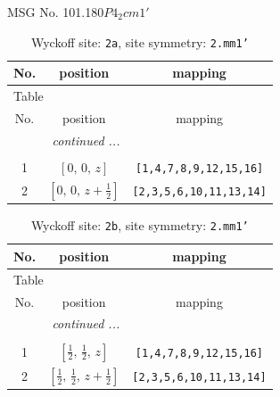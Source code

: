 \documentclass[fleqn,8pt]{jsarticle}
\begin{document}
\setcounter{MaxMatrixCols}{32}

\renewcommand{\tablename}{Table~}
\renewcommand{\figurename}{Figure~}
\begin{center}
\LARGE
MSG No. 101.180\quad$P4_{2}cm1'$
\end{center}
\renewcommand{\arraystretch}{1.2}
\begin{longtable}{ccc}
\caption{Wyckoff site: {\tt 2a}, site symmetry: {\tt 2.mm1'}}
 \\
 \hline \hline
No. & position & mapping \\ \hline \endfirsthead

\multicolumn{2}{l}{\tablename\ \thetable{}} \\
 \hline \hline
No. & position & mapping \\ \hline \endhead

 \hline \hline
\multicolumn{2}{r}{\footnotesize\it continued ...} \\ \endfoot

 \hline \hline
\multicolumn{2}{r}{} \\ \endlastfoot

1 & $\left[ 0,\, 0,\, z \right]$ & {\tt [1,4,7,8,9,12,15,16]} \\ \hline
2 & $\left[ 0,\, 0,\, z + \frac{1}{2} \right]$ & {\tt [2,3,5,6,10,11,13,14]} \\
\end{longtable}
\renewcommand{\arraystretch}{1.2}
\begin{longtable}{ccc}
\caption{Wyckoff site: {\tt 2b}, site symmetry: {\tt 2.mm1'}}
 \\
 \hline \hline
No. & position & mapping \\ \hline \endfirsthead

\multicolumn{2}{l}{\tablename\ \thetable{}} \\
 \hline \hline
No. & position & mapping \\ \hline \endhead

 \hline \hline
\multicolumn{2}{r}{\footnotesize\it continued ...} \\ \endfoot

 \hline \hline
\multicolumn{2}{r}{} \\ \endlastfoot

1 & $\left[ \frac{1}{2},\, \frac{1}{2},\, z \right]$ & {\tt [1,4,7,8,9,12,15,16]} \\ \hline
2 & $\left[ \frac{1}{2},\, \frac{1}{2},\, z + \frac{1}{2} \right]$ & {\tt [2,3,5,6,10,11,13,14]} \\
\end{longtable}
\end{document}
